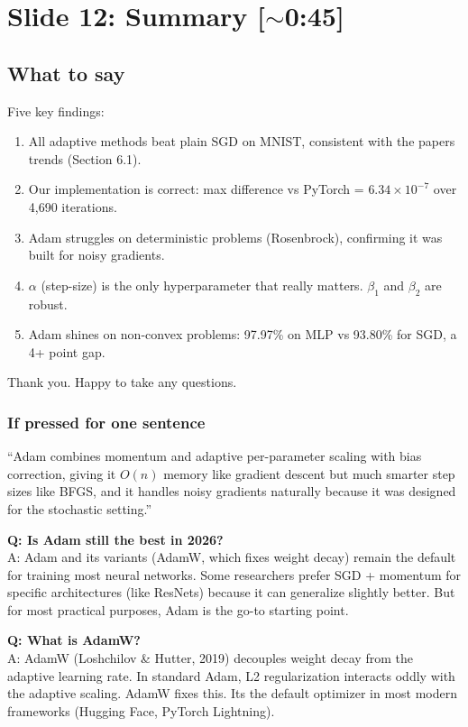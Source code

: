 \documentclass[11pt, letterpaper]{article}
\begin{document}
\section{Slide 12: Summary \textnormal{\color{muted}[$\sim$0:45]}}

\subsection{What to say}

Five key findings:
\begin{enumerate}[leftmargin=2em, itemsep=3pt]
  \item All adaptive methods beat plain SGD on MNIST, consistent with the papers trends (Section 6.1).
  \item Our implementation is correct: max difference vs PyTorch = $6.34 \times 10^{-7}$ over 4,690 iterations.
  \item Adam struggles on deterministic problems (Rosenbrock), confirming it was built for noisy gradients.
  \item $\alpha$ (step-size) is the only hyperparameter that really matters. $\beta_1$ and $\beta_2$ are robust.
  \item Adam shines on non-convex problems: 97.97\% on MLP vs 93.80\% for SGD, a 4+ point gap.
\end{enumerate}

Thank you. Happy to take any questions.

\begin{deepdive}
\subsubsection{If pressed for one sentence}
``Adam combines momentum and adaptive per-parameter scaling with bias correction, giving it $O(n)$ memory like gradient descent but much smarter step sizes like BFGS, and it handles noisy gradients naturally because it was designed for the stochastic setting.''
\end{deepdive}

\begin{qabox}
\textbf{Q: Is Adam still the best in 2026?}\\
A: Adam and its variants (AdamW, which fixes weight decay) remain the default for training most neural networks. Some researchers prefer SGD + momentum for specific architectures (like ResNets) because it can generalize slightly better. But for most practical purposes, Adam is the go-to starting point.

\textbf{Q: What is AdamW?}\\
A: AdamW (Loshchilov \& Hutter, 2019) decouples weight decay from the adaptive learning rate. In standard Adam, L2 regularization interacts oddly with the adaptive scaling. AdamW fixes this. Its the default optimizer in most modern frameworks (Hugging Face, PyTorch Lightning).
\end{qabox}
\end{document}
